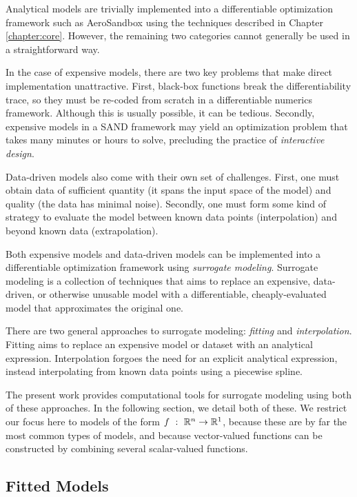 Analytical models are trivially implemented into a differentiable optimization framework such as AeroSandbox using the techniques described in Chapter \ref{chapter:core}. However, the remaining two categories cannot generally be used in a straightforward way.

In the case of expensive models, there are two key problems that make direct implementation unattractive. First, black-box functions break the differentiability trace, so they must be re-coded from scratch in a differentiable numerics framework. Although this is usually possible, it can be tedious. Secondly, expensive models in a SAND framework may yield an optimization problem that takes many minutes or hours to solve, precluding the practice of \textit{interactive design}.

Data-driven models also come with their own set of challenges. First, one must obtain data of sufficient quantity (it spans the input space of the model) and quality (the data has minimal noise). Secondly, one must form some kind of strategy to evaluate the model between known data points (interpolation) and beyond known data (extrapolation).

Both expensive models and data-driven models can be implemented into a differentiable optimization framework using \textit{surrogate modeling}. Surrogate modeling is a collection of techniques that aims to replace an expensive, data-driven, or otherwise unusable model with a differentiable, cheaply-evaluated model that approximates the original one.

There are two general approaches to surrogate modeling: \textit{fitting} and \textit{interpolation}. Fitting aims to replace an expensive model or dataset with an analytical expression. Interpolation forgoes the need for an explicit analytical expression, instead interpolating from known data points using a piecewise spline.

The present work provides computational tools for surrogate modeling using both of these approaches. In the following section, we detail both of these. We restrict our focus here to models of the form $f\ :\ \mathbb{R}^n \to \mathbb{R}^1$, because these are by far the most common types of models, and because vector-valued functions can be constructed by combining several scalar-valued functions.

\subsection{Fitted Models}
\label{sect:fitting}


